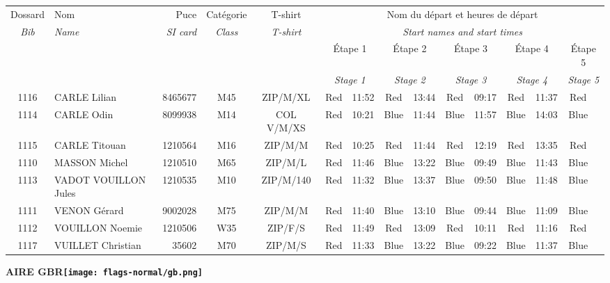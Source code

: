\documentclass{report}
\begin{document}
  \begin{longtable}{|c|l|r|c|c|*{5}{cc|}}
    Dossard & Nom  & Puce    & Catégorie & T-shirt & \multicolumn{10}{c|}{Nom du départ et heures de départ} \\
    \itshape Bib     & \itshape Name & \itshape SI card & \itshape Class  & \itshape  T-shirt  & \multicolumn{10}{c|}{\itshape Start names and start times} \\
    \hline
    & & & & & \multicolumn{2}{c|}{Étape 1} & \multicolumn{2}{c|}{Étape 2} & \multicolumn{2}{c|}{Étape 3} & \multicolumn{2}{c|}{Étape 4} & \multicolumn{2}{c|}{Étape 5} \\
    & & & & & \multicolumn{2}{c|}{\itshape Stage 1} & \multicolumn{2}{c|}{\itshape Stage 2} & \multicolumn{2}{c|}{\itshape Stage 3} & \multicolumn{2}{c|}{\itshape Stage 4} & \multicolumn{2}{c|}{\itshape Stage 5} \\
    \hline
    1116 & CARLE Lilian & 8465677 & M45 & ZIP/M/XL & Red & 11:52 & Red & 13:44 & Red & 09:17 & Red & 11:37 & Red &  \\
    1114 & CARLE Odin & 8099938 & M14 & COL V/M/XS & Red & 10:21 & Blue & 11:44 & Blue & 11:57 & Blue & 14:03 & Blue &  \\
    1115 & CARLE Titouan & 1210564 & M16 & ZIP/M/M & Red & 10:25 & Red & 11:44 & Red & 12:19 & Red & 13:35 & Red &  \\
    1110 & MASSON Michel & 1210510 & M65 & ZIP/M/L & Red & 11:46 & Blue & 13:22 & Blue & 09:49 & Blue & 11:43 & Blue &  \\
    1113 & VADOT VOUILLON Jules & 1210535 & M10 & ZIP/M/140 & Red & 11:32 & Blue & 13:37 & Blue & 09:50 & Blue & 11:48 & Blue &  \\
    1111 & VENON Gérard & 9002028 & M75 & ZIP/M/M & Red & 11:40 & Blue & 13:10 & Blue & 09:44 & Blue & 11:09 & Blue &  \\
    1112 & VOUILLON Noemie & 1210506 & W35 & ZIP/F/S & Red & 11:49 & Red & 13:09 & Red & 10:11 & Red & 11:16 & Red &  \\
    1117 & VUILLET Christian & 35602 & M70 & ZIP/M/S & Red & 11:33 & Blue & 13:22 & Blue & 09:22 & Blue & 11:37 & Blue &  \\
  \end{longtable}
\newpage
  \Huge \centering \bfseries AIRE  GBR\normalfont \footnotesize \sffamily \hfill \texttt{[image: flags-normal/gb.png]} \newline 
\end{document}
